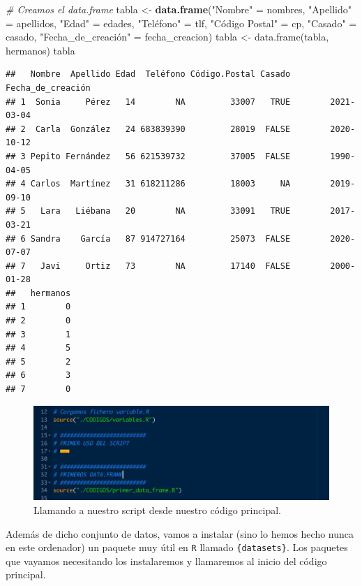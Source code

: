 \documentclass[11pt,]{book}
\newenvironment{Shaded}{\begin{snugshade}}{\end{snugshade}}
\newcommand{\CommentTok}[1]{\textcolor[rgb]{0.37,0.37,0.37}{\textit{#1}}}
\newcommand{\KeywordTok}[1]{\textcolor[rgb]{0.27,0.27,0.27}{\textbf{#1}}}
\newcommand{\NormalTok}[1]{#1}
\newcommand{\StringTok}[1]{\textcolor[rgb]{0.5,0.5,0.5}{#1}}
\begin{document}
\begin{Shaded}
\begin{Highlighting}[]
\CommentTok{# Creamos el data.frame}
\NormalTok{tabla <-}\StringTok{ }\KeywordTok{data.frame}\NormalTok{(}\StringTok{"Nombre"}\NormalTok{ =}\StringTok{ }\NormalTok{nombres, }\StringTok{"Apellido"}\NormalTok{ =}\StringTok{ }\NormalTok{apellidos,}
                    \StringTok{"Edad"}\NormalTok{ =}\StringTok{ }\NormalTok{edades, }\StringTok{"Teléfono"}\NormalTok{ =}\StringTok{ }\NormalTok{tlf, }\StringTok{"Código Postal"}\NormalTok{ =}\StringTok{ }\NormalTok{cp,}
                    \StringTok{"Casado"}\NormalTok{ =}\StringTok{ }\NormalTok{casado, }\StringTok{"Fecha_de_creación" = fecha_creacion)}
\StringTok{tabla <- data.frame(tabla, hermanos)}
\StringTok{tabla}
\end{Highlighting}
\end{Shaded}

\begin{verbatim}
##   Nombre  Apellido Edad  Teléfono Código.Postal Casado Fecha_de_creación
## 1  Sonia     Pérez   14        NA         33007   TRUE        2021-03-04
## 2  Carla  González   24 683839390         28019  FALSE        2020-10-12
## 3 Pepito Fernández   56 621539732         37005  FALSE        1990-04-05
## 4 Carlos  Martínez   31 618211286         18003     NA        2019-09-10
## 5   Lara   Liébana   20        NA         33091   TRUE        2017-03-21
## 6 Sandra    García   87 914727164         25073  FALSE        2020-07-07
## 7   Javi     Ortiz   73        NA         17140  FALSE        2000-01-28
##   hermanos
## 1        0
## 2        0
## 3        1
## 4        5
## 5        2
## 6        3
## 7        0
\end{verbatim}

\begin{figure}

{\centering \includegraphics[width=0.5\linewidth]{./img/codigo_2} 

}

\caption{Llamando a nuestro script desde nuestro código principal.}\label{fig:codigo-2}
\end{figure}

Además de dicho conjunto de datos, vamos a instalar (sino lo hemos hecho nunca en este ordenador) un paquete muy útil en \texttt{R} llamado \texttt{\{datasets\}}. Los paquetes que vayamos necesitando los instalaremos y llamaremos al inicio del código principal.
\end{document}
